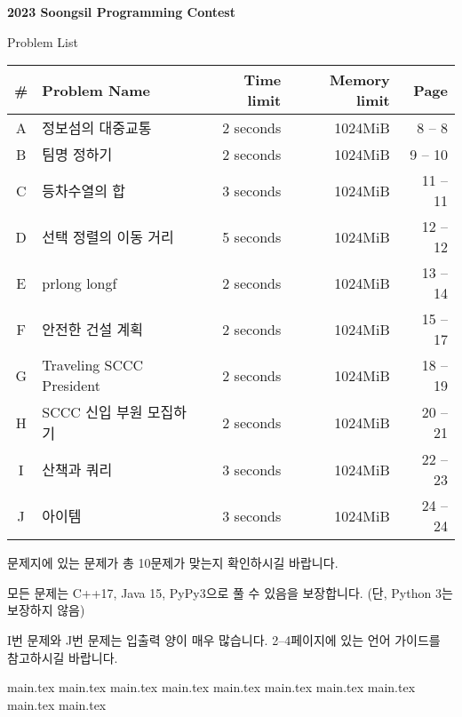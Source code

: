 \documentclass [11pt, a4paper, oneside] {article}
\begin{document}
    \begin{center}
    
    \vspace*{21mm}
    {
        \Huge
        \textbf{2023 Soongsil Programming Contest}
        
        \vspace{30mm}
        Problem List
        \vspace{10mm}
    }
    
    \begin{tabular}{|c|l|r|r|r|}
    \hline
    \# & Problem Name & Time limit & Memory limit & Page \\ \hline
        A & 정보섬의 대중교통 & 2 seconds & 1024MiB & \phantom{0}8 -- \phantom{0}8 \\ \hline
        B & 팀명 정하기 & 2 seconds & 1024MiB & \phantom{0}9 -- 10 \\ \hline
        C & 등차수열의 합 & 3 seconds & 1024MiB & 11 -- 11 \\ \hline
        D & 선택 정렬의 이동 거리 & 5 seconds & 1024MiB & 12 -- 12 \\ \hline
        E & prlong longf & 2 seconds & 1024MiB & 13 -- 14 \\ \hline
        F & 안전한 건설 계획 & 2 seconds & 1024MiB & 15 -- 17 \\ \hline
        G & Traveling SCCC President & 2 seconds & 1024MiB & 18 -- 19 \\ \hline
        H & SCCC 신입 부원 모집하기 & 2 seconds & 1024MiB & 20 -- 21 \\ \hline
        I & 산책과 쿼리 & 3 seconds & 1024MiB & 22 -- 23 \\ \hline
        J & 아이템 & 3 seconds & 1024MiB & 24 -- 24 \\ \hline
    \end{tabular}
    
    문제지에 있는 문제가 총 10문제가 맞는지 확인하시길 바랍니다.

    모든 문제는 C++17, Java 15, PyPy3으로 풀 수 있음을 보장합니다. (단, Python 3는 보장하지 않음)

    I번 문제와 J번 문제는 입출력 양이 매우 많습니다. 2--4페이지에 있는 언어 가이드를 참고하시길 바랍니다.
    
    \end{center}
    	
    \pagebreak
    
    {main.tex} \pagebreak
    {main.tex} \pagebreak
    {main.tex} \pagebreak
    {main.tex} \pagebreak
    {main.tex} \pagebreak
    {main.tex} \pagebreak
    {main.tex} \pagebreak
    {main.tex} \pagebreak
    {main.tex} \pagebreak
    {main.tex} \pagebreak
    
\end{document}
